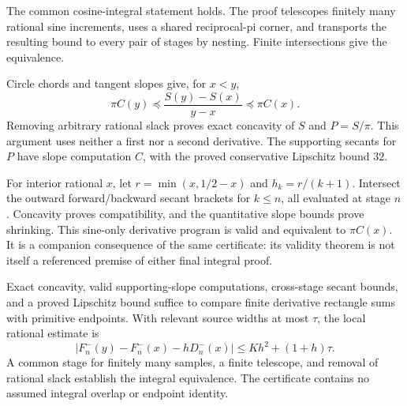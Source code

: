 \begin{theorem}
\label{thm:cosine-comparison-direct}
\leanok
The common cosine-integral statement holds.  The proof
 telescopes finitely many
rational sine increments, uses a shared reciprocal-pi corner, and transports
the resulting bound to every pair of stages by nesting.  Finite
intersections give the equivalence.
\end{theorem}

\begin{lemma}
\label{lem:cosine-comparison-concavity}
\leanok
Circle chords and tangent slopes give, for $x<y$,
\[
 \pi C(y)\preceq\frac{S(y)-S(x)}{y-x}\preceq\pi C(x).
\]
Removing arbitrary rational slack proves exact concavity of $S$ and
$P=S/\pi$.  This argument uses neither a first nor a second derivative.
The supporting secants for $P$ have slope computation $C$, with the proved
conservative Lipschitz bound $32$.
\end{lemma}

\begin{theorem}
\label{thm:cosine-comparison-derivative}
\leanok
For interior rational $x$, let $r=\min(x,1/2-x)$ and $h_k=r/(k+1)$.
Intersect the outward forward/backward secant brackets for $k\le n$,
all evaluated at stage $n$.  Concavity proves compatibility, and the
quantitative slope bounds prove shrinking.  This sine-only derivative
program is valid and equivalent to $\pi C(x)$.
It is a companion consequence of the same certificate: its validity theorem
is not itself a referenced premise of either final integral proof.
\end{theorem}

\begin{theorem}
\label{thm:cosine-comparison-general-ftc}
\leanok
Exact concavity, valid supporting-slope computations, cross-stage secant
bounds, and a proved Lipschitz bound suffice to compare finite derivative
rectangle sums with primitive endpoints.  With relevant source widths at
most $\tau$, the local rational estimate is
\[
 |F_n^-(y)-F_n^-(x)-hD_n^-(x)|\le Kh^2+(1+h)\tau.
\]
A common stage for finitely many samples, a finite telescope, and removal
of rational slack establish the integral equivalence.  The certificate
contains no assumed integral overlap or endpoint identity.
\end{theorem}


